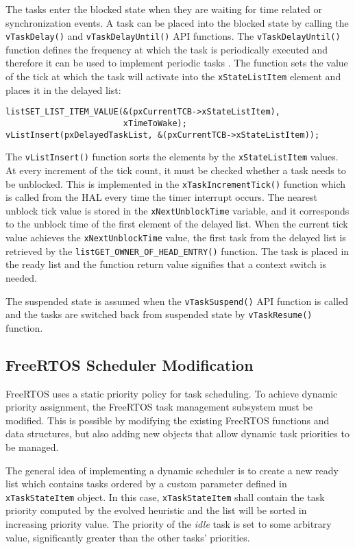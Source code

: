 The tasks enter the blocked state when they are waiting for time related or synchronization events. 
A task can be placed into the blocked state by calling the \verb$vTaskDelay()$ and \verb$vTaskDelayUntil()$ API functions. 
The \verb$vTaskDelayUntil()$ function defines the frequency at which the task is periodically executed and therefore it can be used to implement periodic tasks \cite{carraro2016implementation}.
The function sets the value of the tick at which the task will activate into the \verb$xStateListItem$ element and places it in the delayed list:
\begin{lstlisting}[frame=none, label={lst:delay}, caption={Transition to blocked state.}, captionpos=b]
listSET_LIST_ITEM_VALUE(&(pxCurrentTCB->xStateListItem), 
						xTimeToWake);
vListInsert(pxDelayedTaskList, &(pxCurrentTCB->xStateListItem));
\end{lstlisting}
The \verb$vListInsert()$ function sorts the elements by the \verb$xStateListItem$ values. 
At every increment of the tick count, it must be checked whether a task needs to be unblocked. 
This is implemented in the \verb$xTaskIncrementTick()$ function which is called from the HAL every time the timer interrupt occurs.
The nearest unblock tick value is stored in the \verb$xNextUnblockTime$ variable, and it corresponds to the unblock time of the first element of the delayed list.
When the current tick value achieves the \verb$xNextUnblockTime$ value, the first task from the delayed list is retrieved by the \verb$listGET_OWNER_OF_HEAD_ENTRY()$ function.
The task is placed in the ready list and the function return value signifies that a context switch is needed.

The suspended state is assumed when the \verb$vTaskSuspend()$ API function is called and the tasks are switched back from suspended state by \verb$vTaskResume()$ function.

\subsection{FreeRTOS Scheduler Modification}
FreeRTOS uses a static priority policy for task scheduling. 
To achieve dynamic priority assignment, the FreeRTOS task management subsystem must be modified. 
This is possible by modifying the existing FreeRTOS functions and data structures, but also adding new objects that allow dynamic task priorities to be managed. 

The general idea of implementing a dynamic scheduler is to create a new ready list which contains tasks ordered by a custom parameter defined in \verb$xTaskStateItem$ object.
In this case, \verb$xTaskStateItem$ shall contain the task priority computed by the evolved heuristic and the list will be sorted in increasing priority value. 
The priority of the \textit{idle} task is set to some arbitrary value, significantly greater than the other tasks' priorities. 

